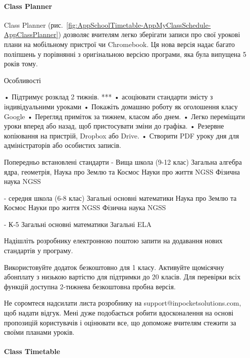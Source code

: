 \paragraph{Class Planner}

Class Planner (рис.~\ref{fig:AppSchoolTimetable-AppMyClassSchedule-AppClassPlanner}) дозволяє вчителям легко зберігати записи про свої урокові плани на мобільному пристрої чи Chromebook. Ця нова версія надає багато поліпшень у порівнянні з оригінальною версією програми, яка була випущена 5 років тому.

Особливості

• Підтримує розклад 2 тижнів. ***
• асоціювати стандарти змісту з індивідуальними уроками
• Покажіть домашню роботу як оголошення класу Google
• Перегляд приміток за тижнем, класом або днем.
• Легко переміщати уроки вперед або назад, щоб пристосувати зміни до графіка.
• Резервне копіювання на пристрій, Dropbox або Drive.
• Створити PDF уроку дня для адміністраторів або особистих записів.

Попередньо встановлені стандарти
- Вища школа (9-12 клас)
Загальна алгебра ядра, геометрія,
Наука про Землю та Космос
Науки про життя NGSS
Фізична наука NGSS

- середня школа (6-8 клас)
Загальні основні математики
Наука про Землю та Космос
Науки про життя NGSS
Фізична наука NGSS

- К-5
Загальні основні математики
Загальні ELA

Надішліть розробнику електронною поштою запити на додавання нових стандартів у програму.

Використовуйте додаток безкоштовно для 1 класу. Активуйте щомісячну абонплату з низькою вартістю для підтримки до 20 класів. Для перевірки всіх функцій доступна 2-тижнева безкоштовна пробна версія.

Не соромтеся надсилати листа розробнику на support@inpocketsolutions.com, щоб надати відгук. Мені дуже подобається робити вдосконалення на основі пропозицій користувачів і оцінювати все, що допоможе вчителям стежити за своїми планами уроків.

\paragraph{Class Timetable}


